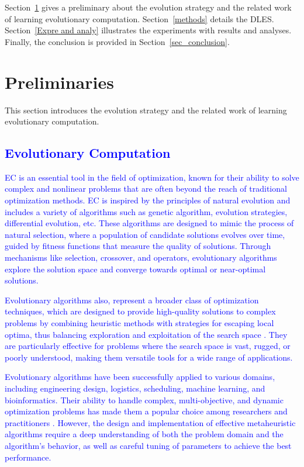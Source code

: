 \documentclass[journal,twoside]{IEEEtran}
\begin{document}
Section~\ref{prelim} gives a preliminary about the evolution strategy and the related work of learning evolutionary computation. Section~\ref{methods} details the DLES. Section~\ref{Expre and analy} illustrates the experiments with results and analyses. Finally, the conclusion is provided in Section~\ref{sec_conclusion}.


\section{Preliminaries}\label{prelim}
This section introduces the evolution strategy and the related work of learning evolutionary computation.

\textcolor{blue}{
\subsection{Evolutionary Computation}
EC is an essential tool in the field of optimization, known for their ability to solve complex and nonlinear problems that are often beyond the reach of traditional optimization methods. EC is inspired by the principles of natural evolution and includes a variety of algorithms such as genetic algorithm, evolution strategies, differential evolution, etc. These algorithms are designed to mimic the process of natural selection, where a population of candidate solutions evolves over time, guided by fitness functions that measure the quality of solutions. Through mechanisms like selection, crossover, and operators, evolutionary algorithms explore the solution space and converge towards optimal or near-optimal solutions.}

\textcolor{blue}{
Evolutionary algorithms also, represent a broader class of optimization techniques, which are designed to provide high-quality solutions to complex problems by combining heuristic methods with strategies for escaping local optima, thus balancing exploration and exploitation of the search space \cite{10630664}. They are particularly effective for problems where the search space is vast, rugged, or poorly understood, making them versatile tools for a wide range of applications.}

\textcolor{blue}{
Evolutionary algorithms have been successfully applied to various domains, including engineering design, logistics, scheduling, machine learning, and bioinformatics. Their ability to handle complex, multi-objective, and dynamic optimization problems has made them a popular choice among researchers and practitioners \cite{li2023survey}. However, the design and implementation of effective metaheuristic algorithms require a deep understanding of both the problem domain and the algorithm's behavior, as well as careful tuning of parameters to achieve the best performance.}
\end{document}
